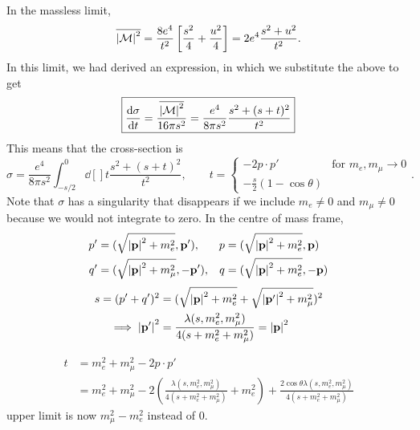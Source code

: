 In the massless limit, 
\begin{equation}
  \overline{\abs{\mathcal{M}}^2} = \frac{8 e^4}{t^2} \left[ \frac{s^2}{4} + \frac{u^2}{4} \right] = 2 e^4 \frac{s ^2 + u ^2}{t^2}.
\end{equation}
In this limit, we had derived an expression, in which we substitute the above to get
\begin{equation}
  \boxed{\dv{\sigma}{t} = \frac{\overline{\abs{\mathcal{M}}^2}}{16 \pi s^2} = \frac{e^4}{8 \pi s^2} \frac{s^2 + (s + t)^2}{t^2}}
\end{equation}
This means that the cross-section is
\begin{equation}
  \sigma = \frac{e^4}{8 \pi s^2} \int_{-s / 2}^0 \dd[]{t} \frac{s^2 + (s + t)^2}{t^2},
  \qquad t = 
  \begin{cases}
    -2 p \cdot p' & \text{for } m_e, m_\mu \to 0 \\
    -\frac{s}{2}(1 - \cos \theta)
  \end{cases}.
\end{equation}
Note that $\sigma$ has a singularity that disappears if we include $m_e \neq 0$ and $m_{\mu} \neq 0$ because we would not integrate to zero.
In the centre of mass frame, 
\begin{align}
  p' &= (\sqrt{\abs{\vb{p}}^2 + m_e^2}, \vb{p}'),  &p &= (\sqrt{\abs{\vb{p}}^2+ m_e^2}, \vb{p}) \\
  q' &= (\sqrt{\abs{\vb{p}}^2 + m_{\mu}^2}, -\vb{p}'), &q &= (\sqrt{\abs{\vb{p}}^2+ m_e^2}, -\vb{p})
\end{align}
\begin{align}
  s = (p' + q')^2 &= (\sqrt{\abs{\vb{p}}^2 + m_e^2} + \sqrt{\abs{\vb{p}'}^2 + m_{\mu}^2})^2 \\
  \implies \abs{\vb{p}'}^2 &= \frac{\lambda(s, m_e^2, m_{\mu}^2)}{4 (s + m_e^2 +m_{\mu}^2)} = \abs{\vb{p}}^2
\end{align}

\begin{remark}
  \begin{align}
    t &= m_e^2 + m_{\mu}^2 - 2 p \cdot p'  \\
      &= m_e^2 + m_{\mu}^2 - 2 \left( \frac{\lambda(s, m_e^2, m_{\mu}^2)}{4(s + m_e^2 + m_{\mu}^2)} + m_e^2 \right) + \frac{2 \cos\theta \lambda(s, m_e^2, m_{\mu}^2)}{4(s + m_e^2 + m_{\mu}^2)}
  \end{align}
  upper limit is now $m_{\mu}^2 - m_e^2$ instead of $0$.
\end{remark}

